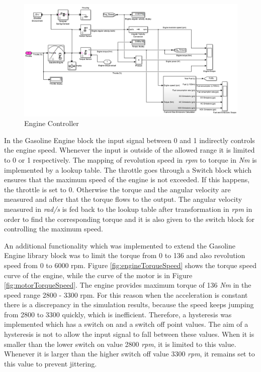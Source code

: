 \begin{figure}[h]
\centering
\includegraphics[scale=0.5]{figures/hev/enginecontroller}
\caption{Engine Controller}
\label{fig:enginecontroller}
\end{figure}

In the Gasoline Engine block the input signal between 0 and 1 indirectly controls the engine speed. Whenever the input is outside of the allowed range it is limited to 0 or 1 respectively. The mapping of revolution speed in \textit{rpm} to torque in \textit{Nm} is implemented by a lookup table. The throttle goes through a Switch block which ensures that the maximum speed of the engine is not exceeded. If this happens, the throttle is set to 0. Otherwise the torque and the angular velocity are measured and after that the torque flows to the output. The angular velocity measured in \textit{rad/s} is fed back to the lookup table after transformation in \textit{rpm} in order to find the corresponding torque and it is also given to the switch block for controlling the maximum speed.

An additional functionality which was implemented to extend the Gasoline Engine library block was to limit the torque from 0 to 136 and also revolution speed from 0 to 6000 rpm. Figure \ref{fig:engineTorqueSpeed} shows the torque speed curve of the engine, while the curve of the motor is in Figure \ref{fig:motorTorqueSpeed}. The engine provides maximum torque of 136 \textit{Nm} in the speed range 2800 - 3300 rpm. For this reason when the acceleration is constant there is a discrepancy in the simulation results, because the speed keeps jumping from 2800 to 3300 quickly, which is inefficient. Therefore, a hysteresis was implemented which has a switch on and a switch off point values. The aim of a hysteresis is not to allow the input signal to fall between these values. When it is smaller than the lower switch on value 2800 \textit{rpm}, it is limited to this value. Whenever it is larger than the higher switch off value 3300 \textit{rpm}, it remains set to this value to prevent jittering.

